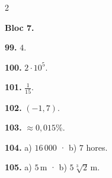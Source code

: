 \documentclass[13pt,a4paper]{extarticle}
\begin{document}
\begin{multicols}{2}
\begin{minipage}{\linewidth}
\textbf{Bloc 7.}\par
\end{minipage}\par\vspace{1.6mm}
\par\noindent\begin{minipage}{\linewidth}
\textbf{99.} $4$.\par
\end{minipage}\par\vspace{1.6mm}
\par\noindent\begin{minipage}{\linewidth}
\textbf{100.} $2\cdot10^5$.\par
\end{minipage}\par\vspace{1.6mm}
\par\noindent\begin{minipage}{\linewidth}
\textbf{101.} $\tfrac1{15}$.\par
\end{minipage}\par\vspace{1.6mm}
\par\noindent\begin{minipage}{\linewidth}
\textbf{102.} $\left(-1,7\right)$.\par
\end{minipage}\par\vspace{1.6mm}
\par\noindent\begin{minipage}{\linewidth}
\textbf{103.} $\approx0{,}015\%$.\par
\end{minipage}\par\vspace{1.6mm}
\par\noindent\begin{minipage}{\linewidth}
\textbf{104.} a) $16\,000$ · b) $7$ hores.\par
\end{minipage}\par\vspace{1.6mm}
\par\noindent\begin{minipage}{\linewidth}
\textbf{105.} a) $5\,\text{m}$ · b) $5\sqrt[3]{2}\,\text{m}$.\par
\end{minipage}\par\vspace{1.6mm}

\end{multicols}
\end{document}
